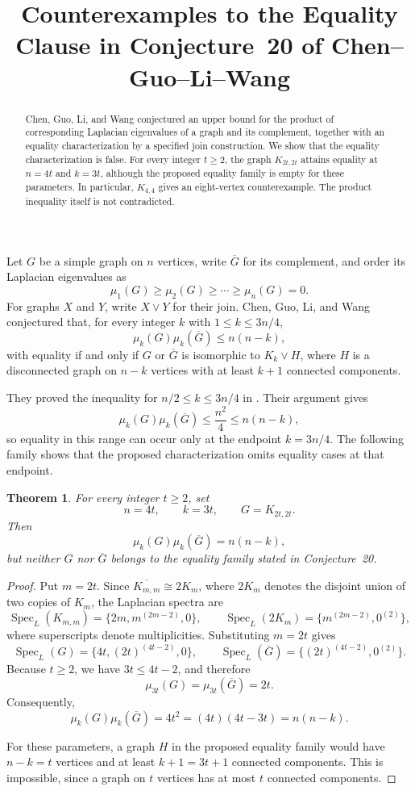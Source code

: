 \documentclass[11pt]{amsart}
\title[Counterexamples to Conjecture 20]
{Counterexamples to the Equality Clause in Conjecture~20 of Chen--Guo--Li--Wang}
\date{}
\newtheorem{theorem}{Theorem}
\begin{document}
\begin{abstract}
Chen, Guo, Li, and Wang conjectured an upper bound for the product of
corresponding Laplacian eigenvalues of a graph and its complement, together
with an equality characterization by a specified join construction. We show
that the equality characterization is false. For every integer $t\ge2$, the
graph $K_{2t,2t}$ attains equality at $n=4t$ and $k=3t$, although the proposed
equality family is empty for these parameters. In particular, $K_{4,4}$ gives
an eight-vertex counterexample. The product inequality itself is not
contradicted.
\end{abstract}

\maketitle

Let $G$ be a simple graph on $n$ vertices, write $\overline G$ for its
complement, and order its Laplacian eigenvalues as
\[
\mu_1(G)\ge\mu_2(G)\ge\cdots\ge\mu_n(G)=0.
\]
For graphs $X$ and $Y$, write $X\vee Y$ for their join. Chen, Guo, Li, and
Wang~\cite[Conjecture~20]{CGLW} conjectured that, for every integer $k$
with $1\le k\le 3n/4$,
\[
\mu_k(G)\mu_k(\overline G)\le n(n-k),
\]
with equality if and only if $G$ or $\overline G$ is isomorphic to
$K_k\vee H$, where $H$ is a disconnected graph on $n-k$ vertices with at
least $k+1$ connected components.

They proved the inequality for $n/2\le k\le3n/4$ in
\cite[Theorem~18]{CGLW}. Their argument gives
\[
\mu_k(G)\mu_k(\overline G)\le \frac{n^2}{4}\le n(n-k),
\]
so equality in this range can occur only at the endpoint $k=3n/4$. The
following family shows that the proposed characterization omits equality
cases at that endpoint.

\begin{theorem}
For every integer $t\ge2$, set
\[
n=4t,\qquad k=3t,\qquad G=K_{2t,2t}.
\]
Then
\[
\mu_k(G)\mu_k(\overline G)=n(n-k),
\]
but neither $G$ nor $\overline G$ belongs to the equality family stated in
Conjecture~20.
\end{theorem}

\begin{proof}
Put $m=2t$. Since $\overline{K_{m,m}}\cong 2K_m$, where $2K_m$ denotes
the disjoint union of two copies of $K_m$, the Laplacian spectra are
\[
\operatorname{Spec}_L(K_{m,m})
 =\{2m,m^{(2m-2)},0\},
\qquad
\operatorname{Spec}_L(2K_m)
 =\{m^{(2m-2)},0^{(2)}\},
\]
where superscripts denote multiplicities. Substituting $m=2t$ gives
\[
\operatorname{Spec}_L(G)
 =\{4t,(2t)^{(4t-2)},0\},
\qquad
\operatorname{Spec}_L(\overline G)
 =\{(2t)^{(4t-2)},0^{(2)}\}.
\]
Because $t\ge2$, we have $3t\le4t-2$, and therefore
\[
\mu_{3t}(G)=\mu_{3t}(\overline G)=2t.
\]
Consequently,
\[
\mu_k(G)\mu_k(\overline G)=4t^2=(4t)(4t-3t)=n(n-k).
\]

For these parameters, a graph $H$ in the proposed equality family would have
$n-k=t$ vertices and at least $k+1=3t+1$ connected components. This is
impossible, since a graph on $t$ vertices has at most $t$ connected
components.
\end{proof}
\end{document}
